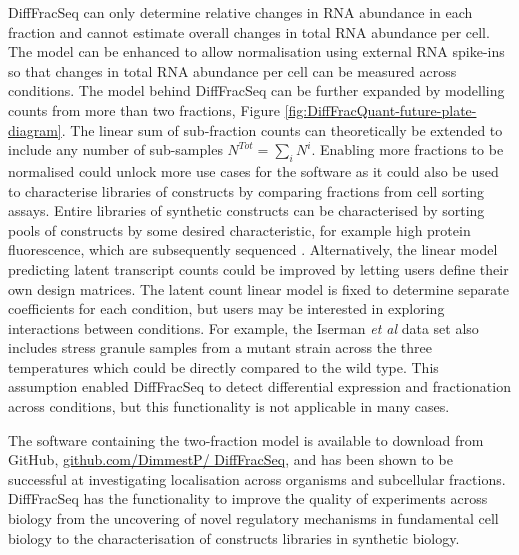 \documentclass[../main.tex]{subfiles}
\begin{document}
DiffFracSeq can only determine relative changes in RNA abundance in each fraction and cannot estimate overall changes in total RNA abundance per cell.
The model can be enhanced to allow normalisation using external RNA spike-ins so that changes in total RNA abundance per cell can be measured across conditions.
The model behind DiffFracSeq can be further expanded by modelling counts from more than two fractions, Figure \ref{fig:DiffFracQuant-future-plate-diagram}.
The linear sum of sub-fraction counts can theoretically be extended to include any number of sub-samples $N^{Tot} = \displaystyle\sum_i N^{i}$.
Enabling more fractions to be normalised could unlock more use cases for the software as it could also be used to characterise libraries of constructs by comparing fractions from cell sorting assays.
Entire libraries of synthetic constructs can be characterised by sorting pools of constructs by some desired characteristic, for example high protein fluorescence, which are subsequently sequenced \parencite{Sharon2012}.
Alternatively, the linear model predicting latent transcript counts could be improved by letting users define their own design matrices.
The latent count linear model is fixed to determine separate coefficients for each condition, but users may be interested in exploring interactions between conditions.
For example, the Iserman \textit{et al} data set also includes stress granule samples from a mutant strain across the three temperatures which could be directly compared to the wild type. 
This assumption enabled DiffFracSeq to detect differential expression and fractionation across conditions, but this functionality is not applicable in many cases.

The software containing the two-fraction model is available to download from GitHub, \href{https://github.com/DimmestP/DiffFracSeq}{github.com/DimmestP/ DiffFracSeq}, and has been shown to be successful at investigating localisation across organisms and subcellular fractions.
DiffFracSeq has the functionality to improve the quality of experiments across biology from the uncovering of novel regulatory mechanisms in fundamental cell biology to the characterisation of constructs libraries in synthetic biology.
\end{document}
